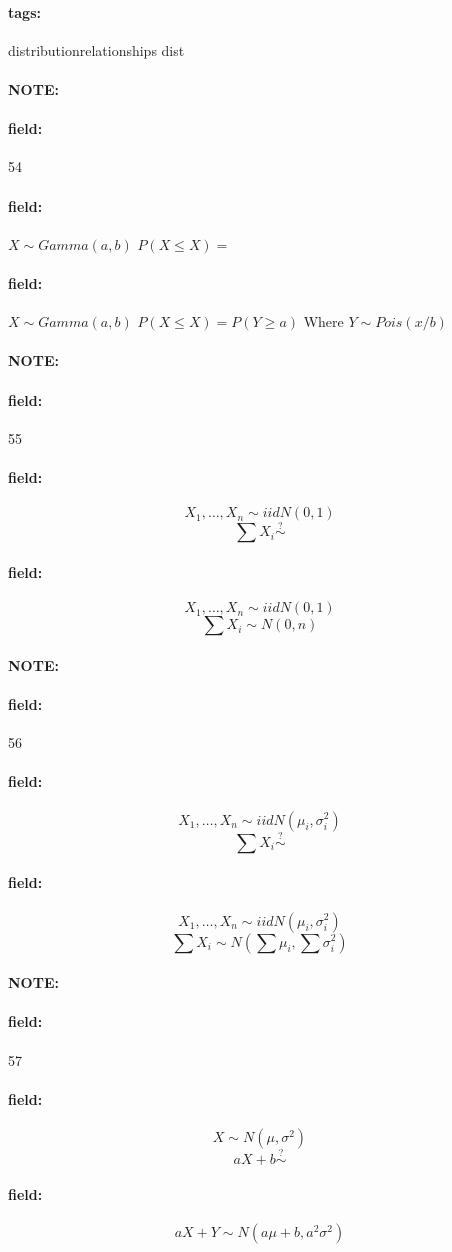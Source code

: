 \documentclass[12pt]{article}
\newenvironment{note}{\paragraph{NOTE:}}{}
\newenvironment{field}{\paragraph{field:}}{}
\newcommand*{\tags}[1]{\paragraph{tags: }#1}
\begin{document}
\tags{distributionrelationships dist}

\begin{note}
  \begin{field}
    \tiny 54
  \end{field}
  \begin{field}
    $X \sim Gamma(a,b)$
    $P(X \leq X) = $
  \end{field}
  \begin{field}
    $X \sim Gamma(a,b)$
    $P(X \leq X) = P(Y \geq a)$
    Where $Y \sim Pois (x/b)$
  \end{field}
\end{note}


\begin{note}
  \begin{field}
    \tiny 55
  \end{field}
  \begin{field}
    $$X_1, \ldots, X_n \sim iid N(0,1)$$
    $$ \sum X_i \overset{?}{\sim}$$
  \end{field}
  \begin{field}
    $$X_1, \ldots, X_n \sim iid N(0,1)$$
    $$ \sum X_i \sim N(0,n)$$
  \end{field}
\end{note}

\begin{note}
  \begin{field}
    \tiny 56
  \end{field}
  \begin{field}
    $$X_1, \ldots, X_n \sim iid N(\mu_i,\sigma_i^2)$$
    $$ \sum X_i \overset{?}{\sim}$$
  \end{field}
  \begin{field}
    $$X_1, \ldots, X_n \sim iid N(\mu_i,\sigma_i^2)$$
    $$ \sum X_i \sim N(\sum \mu_i,\sum \sigma^2_i)$$
  \end{field}
\end{note}

\begin{note}
  \begin{field}
    \tiny 57
  \end{field}
  \begin{field}
    $$X  \sim N(\mu,\sigma^2)$$
    $$ aX + b \overset{?}{\sim}$$
  \end{field}
  \begin{field}
    $$ aX + Y \sim N(a\mu + b, a^2\sigma^2)$$
  \end{field}
\end{note}
\end{document}
